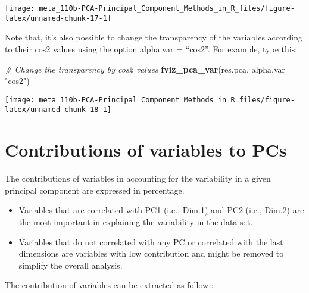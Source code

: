 \documentclass[]{book}
\newenvironment{Shaded}{\begin{snugshade}}{\end{snugshade}}
\newcommand{\CommentTok}[1]{\textcolor[rgb]{0.56,0.35,0.01}{\textit{#1}}}
\newcommand{\DataTypeTok}[1]{\textcolor[rgb]{0.13,0.29,0.53}{#1}}
\newcommand{\DecValTok}[1]{\textcolor[rgb]{0.00,0.00,0.81}{#1}}
\newcommand{\KeywordTok}[1]{\textcolor[rgb]{0.13,0.29,0.53}{\textbf{#1}}}
\newcommand{\NormalTok}[1]{#1}
\newcommand{\OperatorTok}[1]{\textcolor[rgb]{0.81,0.36,0.00}{\textbf{#1}}}
\newcommand{\StringTok}[1]{\textcolor[rgb]{0.31,0.60,0.02}{#1}}
\providecommand{\tightlist}{%
  \setlength{\itemsep}{0pt}\setlength{\parskip}{0pt}}
\begin{document}
\begin{center}\texttt{[image: meta\_110b-PCA-Principal\_Component\_Methods\_in\_R\_files/figure-latex/unnamed-chunk-17-1]} \end{center}

Note that, it's also possible to change the transparency of the variables according to their cos2 values using the option alpha.var = ``cos2''. For example, type this:

\begin{Shaded}
\begin{Highlighting}[]
\CommentTok{# Change the transparency by cos2 values}
\KeywordTok{fviz_pca_var}\NormalTok{(res.pca, }\DataTypeTok{alpha.var =} \StringTok{"cos2"}\NormalTok{)}
\end{Highlighting}
\end{Shaded}

\begin{center}\texttt{[image: meta\_110b-PCA-Principal\_Component\_Methods\_in\_R\_files/figure-latex/unnamed-chunk-18-1]} \end{center}

\hypertarget{contributions-of-variables-to-pcs}{%
\section{Contributions of variables to PCs}\label{contributions-of-variables-to-pcs}}

The contributions of variables in accounting for the variability in a given principal component are expressed in percentage.

\begin{itemize}
\tightlist
\item
  Variables that are correlated with PC1 (i.e., Dim.1) and PC2 (i.e., Dim.2) are the most important in explaining the variability in the data set.
\item
  Variables that do not correlated with any PC or correlated with the last dimensions are variables with low contribution and might be removed to simplify the overall analysis.
\end{itemize}

The contribution of variables can be extracted as follow :

\begin{Shaded}
\end{Shaded}
\end{document}
